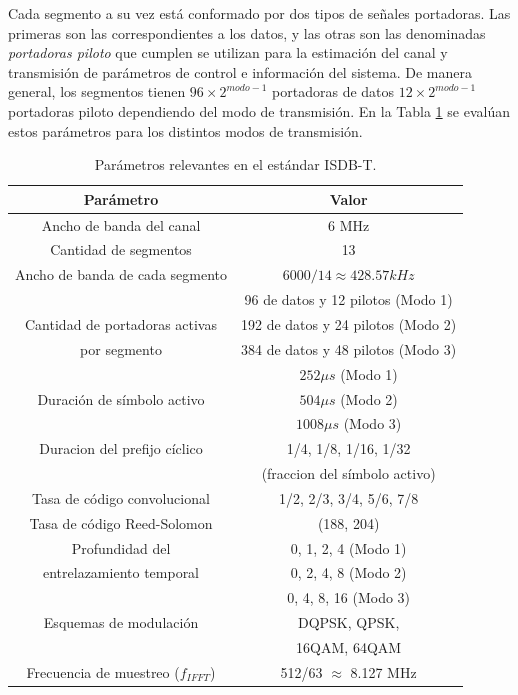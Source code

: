 Cada segmento a su vez est\'a conformado por dos tipos de señales portadoras. Las primeras son las correspondientes a los datos, y las otras son las denominadas \textit{portadoras piloto} que cumplen se utilizan para la estimaci\'on del canal y transmisi\'on de par\'ametros de control e informaci\'on del sistema.
De manera general, los segmentos tienen $96 \times 2^{modo-1}$ portadoras de datos $12 \times 2^{modo-1}$ portadoras piloto dependiendo del modo de transmisi\'on. En la Tabla \ref{parametros_ISDBT} se eval\'uan estos par\'ametros para los distintos modos de transmisi\'on. 



\begin{table}[h!]
\centering
\begin{tabular}{|c|c|}
\hline
\textbf{Parámetro} 				& \textbf{Valor}\\
\hline
Ancho de banda del canal 		& 6 MHz\\
\hline
Cantidad de segmentos 			& 13 \\
\hline
Ancho de banda de cada segmento & $6000/14 \approx 428.57kHz$ \\
\hline
  											& 96 de datos y 12 pilotos (Modo 1) \\
Cantidad de portadoras activas  & 192 de datos y 24 pilotos (Modo 2) \\
 		por segmento									& 384 de datos y 48 pilotos (Modo 3)\\
\hline
 								& $252 \mu s$ (Modo 1)\\
Duración de símbolo activo 		& $504 \mu s$ (Modo 2) \\
								& $1008 \mu s$ (Modo 3) \\
\hline
Duracion del prefijo cíclico 	& 1/4, 1/8, 1/16, 1/32 \\
 								& (fraccion del símbolo activo)\\
\hline
Tasa de código convolucional 	& 1/2, 2/3, 3/4, 5/6, 7/8\\
\hline
Tasa de código Reed-Solomon 	& (188, 204) \\
\hline
 	Profundidad del			& 0, 1, 2, 4 (Modo 1) \\
entrelazamiento temporal & 0, 2, 4, 8 (Modo 2) \\
		 & 0, 4, 8, 16 (Modo 3)\\
\hline
Esquemas de modulación & DQPSK, QPSK,\\
 & 16QAM, 64QAM\\
 \hline
 Frecuencia de muestreo ($f_{IFFT}$) & 512/63 $\approx$ 8.127 MHz\\
 \hline
\end{tabular}
\caption{\label{parametros_ISDBT} Par\'ametros relevantes en el est\'andar ISDB-T.}
\end{table}



